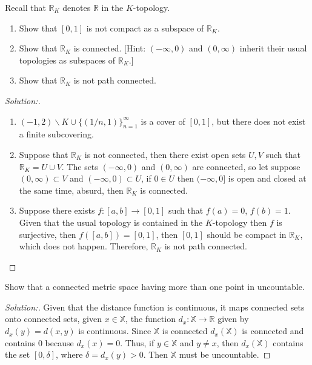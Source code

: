 \documentclass[a4paper,12pt, reqno]{article}
\theoremstyle{definition}
\newenvironment{exerr}[1]{
  \renewcommand\theexeralt{#1}
  \exeralt
}{\endexeralt}
\newenvironment{solution}{\begin{proof}[Solution:]}{\end{proof}}
\newcommand{\R}{\mathbb{R}}
\newcommand{\X}{\mathbb{X}}
\begin{document}
\begin{exerr}{3}
  Recall that $\R_{K}$ denotes $\R$ in the $K$-topology.
  \begin{enumerate}[label=(\alph*)]
    \item Show that $[0,1]$ is not compact as a subspace of $\R_{K}$.
    \item Show that $\R_{K}$ is connected. [Hint: $(-\infty,0)$ and $(0,\infty)$ inherit their usual topologies as subspaces of $\R_{K}$.]
    \item Show that $\R_{K}$ is not path connected.
  \end{enumerate}
\end{exerr}
\begin{solution}\hfill
  \begin{enumerate}[label=(\alph*)]
    \item $(-1,2)\backslash K \cup\{ (1/n,1) \}_{n=1}^\infty$ is a cover of $[0,1]$, but there does not exist a finite subcovering.
    \item Suppose that $\R_{K}$ is not connected, then there exist open sets $U,V$ such that $\R_{K} = U\cup V$. The sets $(-\infty, 0)$ and $(0,\infty)$ are connected, so let suppose $(0,\infty)\subset V$ and $(-\infty,0)\subset U$, if $0\in U$ then $(-\infty,0]$ is open and closed at the same time, absurd, then $\R_{K}$ is connected.
    \item Suppose there exists $f:[a,b]\to[0,1]$ such that $f(a) = 0$, $f(b) = 1$. Given that the usual topology is contained in the $K$-topology then $f$ is surjective, then $f([a,b]) = [0,1]$, then $[0,1]$ should be compact in $\R_{K}$, which does not happen. Therefore, $\R_{K}$ is not path connected.
  \end{enumerate}
\end{solution}

\begin{exerr}{4}
  Show that a connected metric space having more than one point in uncountable.
\end{exerr}
\begin{solution}
Given that the distance function is continuous, it maps connected sets onto connected sets, given $x\in\X$, the function $d_{x}:\X\to\R$ given by $d_{x}(y) = d(x,y)$ is continuous. Since $\X$ is connected $d_{x}(\X)$ is connected and contains $0$ because $d_{x}(x) = 0$. Thus, if $y\in\X$ and $y\neq x$, then $d_{x}(\X)$ contains the set $[0,\delta]$, where $\delta = d_{x}(y)>0$. Then $\X$ must be uncountable.
\end{solution}
\end{document}
